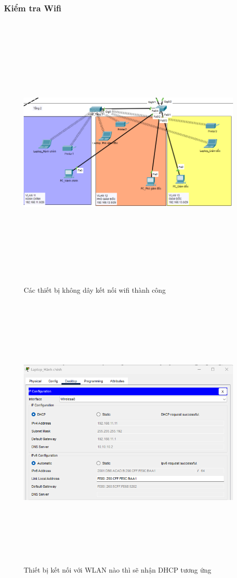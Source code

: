 \documentclass[a4paper, 12pt]{article}
\begin{document}
\subsubsection{Kiểm tra Wifi}
\begin{figure}[H]
    \centering
    \includegraphics[width=16cm, height=14cm]{img/4.13.2e.png}
    \caption{Các thiết bị không dây kết nối wifi thành công}
    \label{hinh4132e}
\end{figure}

\begin{figure}[H]
    \centering
    \includegraphics[width=16cm, height=14cm]{img/4.13.2f.png}
    \caption{Thiết bị kết nối với WLAN nào thì sẽ nhận DHCP tương ứng}
    \label{hinh4132f}
\end{figure}
\end{document}
